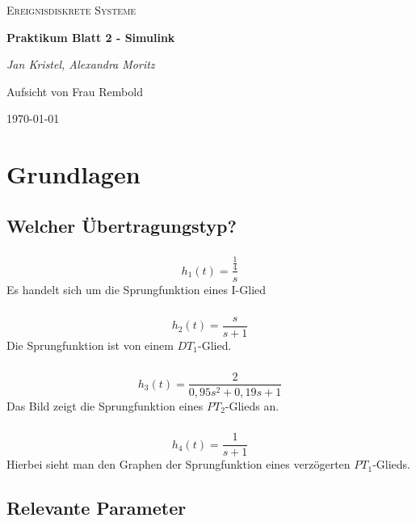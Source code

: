 \documentclass{article}
\begin{document}
	\begin{titlepage}
		\centering
		{\scshape\LARGE
			Ereignisdiskrete Systeme
			\par}
		\vspace{1.5cm}
		{\huge\bfseries Praktikum Blatt 2 - Simulink\par}
		\vspace{1.5cm}
		{\LARGE\itshape Jan Kristel, Alexandra Moritz\par}
		\vfill
			Aufsicht von Frau Rembold\par
			
		\vfill	
			{\large \today \par}	
		
	\end{titlepage}
	
	\tableofcontents
	\newpage
	
	\section{Grundlagen}
		\subsection{Welcher Übertragungstyp?}
			\renewcommand{\thesubsubsection}{\alph{subsubsection})}
			\subsubsection{}
				$$h_1(t) = \frac{\frac{1}{4}}{s}$$
				Es handelt sich um die Sprungfunktion eines I-Glied
			\subsubsection{}
				$$h_2(t) = \frac{s}{s + 1}$$
				Die Sprungfunktion ist von einem $DT_1$-Glied.
			\subsubsection{}
				$$h_3(t) = \frac{2}{0,95s^2 + 0,19s +1}$$
				Das Bild zeigt die Sprungfunktion eines $PT_2$-Glieds an.
			\subsubsection{}
				$$h_4(t) = \frac{1}{s + 1}$$
				Hierbei sieht man den Graphen der Sprungfunktion eines verzögerten $PT_1$-Glieds.
		\subsection{Relevante Parameter}
\end{document}
